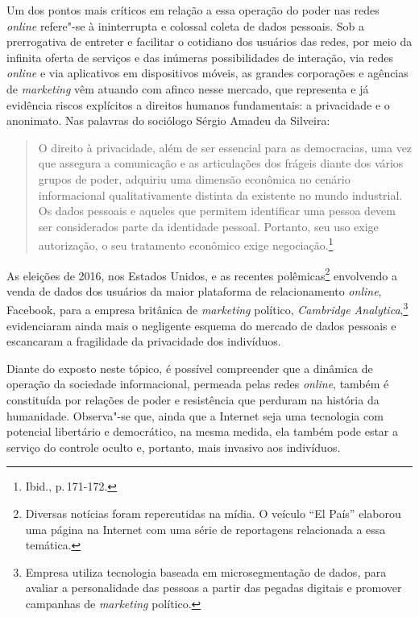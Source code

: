 Um dos pontos mais críticos em relação a essa operação do poder nas
redes \emph{online} refere"-se à ininterrupta e colossal coleta de dados
pessoais. Sob a prerrogativa de entreter e facilitar o cotidiano dos
usuários das redes, por meio da infinita oferta de serviços e das
inúmeras possibilidades de interação, via redes \emph{online} e via aplicativos
em dispositivos móveis, as grandes corporações e agências de \emph{marketing}
vêm atuando com afinco nesse mercado, que representa e já evidência
riscos explícitos a direitos humanos fundamentais: a privacidade e o
anonimato. Nas palavras do sociólogo Sérgio Amadeu da Silveira:

\begin{quote}
O direito à privacidade, além de ser essencial para as democracias, uma
vez que assegura a comunicação e as articulações dos frágeis diante dos
vários grupos de poder, adquiriu uma dimensão econômica no cenário
informacional qualitativamente distinta da existente no mundo
industrial. Os dados pessoais e aqueles que permitem identificar uma
pessoa devem ser considerados parte da identidade pessoal. Portanto, seu
uso exige autorização, o seu tratamento econômico exige negociação.\footnote{Ibid., p.\,171-172.}
\end{quote}

As eleições de 2016, nos Estados Unidos, e as recentes
polêmicas\footnote{Diversas notícias foram repercutidas na mídia. O
  veículo ``El País'' elaborou uma página na Internet com uma série de
  reportagens relacionada a essa temática.} envolvendo a venda de dados
dos usuários da maior plataforma de relacionamento \emph{online}, Facebook,
para a empresa britânica de \emph{marketing} político, \emph{Cambridge
Analytica},\footnote{Empresa utiliza tecnologia baseada em
  microsegmentação de dados, para avaliar a personalidade das pessoas a
  partir das pegadas digitais e promover campanhas de \emph{marketing}
  político.} evidenciaram ainda mais o negligente esquema do
mercado de dados pessoais e escancaram a fragilidade da privacidade dos
indivíduos.

Diante do exposto neste tópico, é possível compreender que a dinâmica de
operação da sociedade informacional, permeada pelas redes \emph{online}, também
é constituída por relações de poder e resistência que perduram na
história da humanidade. Observa"-se que, ainda que a Internet seja uma
tecnologia com potencial libertário e democrático, na mesma medida, ela
também pode estar a serviço do controle oculto e, portanto, mais
invasivo aos indivíduos.

